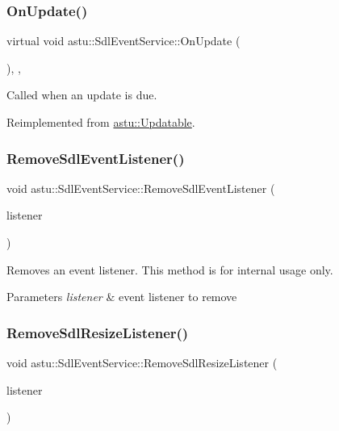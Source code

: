 \subsubsection{\texorpdfstring{On\+Update()}{OnUpdate()}}
{\footnotesize\ttfamily virtual void astu\+::\+Sdl\+Event\+Service\+::\+On\+Update (\begin{DoxyParamCaption}{ }\end{DoxyParamCaption})\hspace{0.3cm}{\ttfamily [override]}, {\ttfamily [protected]}, {\ttfamily [virtual]}}

Called when an update is due. 

Reimplemented from \hyperlink{classastu_1_1Updatable_a925566c9770b95895c6c7294f9d51528}{astu\+::\+Updatable}.

\mbox{\label{classastu_1_1SdlEventService_ae3deae7488de012e7789662c314fd260}} 
\subsubsection{\texorpdfstring{Remove\+Sdl\+Event\+Listener()}{RemoveSdlEventListener()}}
{\footnotesize\ttfamily void astu\+::\+Sdl\+Event\+Service\+::\+Remove\+Sdl\+Event\+Listener (\begin{DoxyParamCaption}\item[{I\+Sdl\+Event\+Listener \&}]{listener }\end{DoxyParamCaption})}

Removes an event listener. This method is for internal usage only.


\begin{DoxyParams}{Parameters}
{\em listener} & event listener to remove \\
\hline
\end{DoxyParams}
\mbox{\label{classastu_1_1SdlEventService_aeba11c482d2f1c7701a44f9dbbf917df}} 
\subsubsection{\texorpdfstring{Remove\+Sdl\+Resize\+Listener()}{RemoveSdlResizeListener()}}
{\footnotesize\ttfamily void astu\+::\+Sdl\+Event\+Service\+::\+Remove\+Sdl\+Resize\+Listener (\begin{DoxyParamCaption}\item[{\hyperlink{classastu_1_1ISdlResizeListener}{I\+Sdl\+Resize\+Listener} \&}]{listener }\end{DoxyParamCaption})}

